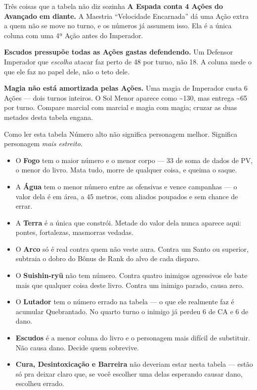\begin{aviso}{Três coisas que a tabela não diz sozinha}
    \textbf{A Espada conta 4 Ações do Avançado em diante.} A Maestria \enquote{Velocidade
    Encarnada} dá uma Ação extra a quem não se move no turno, e os números já assumem isso.
    Ela é a única coluna com uma 4ª Ação antes do Imperador.

    \medskip
    \textbf{Escudos pressupõe todas as Ações gastas defendendo.} Um Defensor Imperador que
    \emph{escolha} atacar faz perto de 48 por turno, não 18. A coluna mede o que ele faz no
    papel dele, não o teto dele.

    \medskip
    \textbf{Magia não está amortizada pelas Ações.} Uma magia de Imperador custa 6 Ações ---
    dois turnos inteiros. O Sol Menor aparece como \textasciitilde130, mas entrega
    \textasciitilde65 por turno. Compare marcial com marcial e magia com magia; cruzar as
    duas metades desta tabela engana.
\end{aviso}

\begin{nota}{Como ler esta tabela}
    Número alto não significa personagem melhor. Significa personagem \emph{mais estreito}.

    \begin{itemize}
        \item O \textbf{Fogo} tem o maior número e o menor corpo --- 33 de soma de dados de
              PV, o menor do livro. Mata tudo, morre de qualquer coisa, e queima o saque.
        \item A \textbf{Água} tem o menor número entre as ofensivas e vence campanhas --- o
              valor dela é em área, a 45 metros, com aliados poupados e sem chance de errar.
        \item A \textbf{Terra} é a única que constrói. Metade do valor dela nunca aparece
              aqui: pontes, fortalezas, masmorras vedadas.
        \item O \textbf{Arco} só é real contra quem não veste aura. Contra um Santo ou
              superior, subtraia o dobro do Bônus de Rank do alvo de cada disparo.
        \item O \textbf{Suishin-ryū} não tem número. Contra quatro inimigos agressivos ele bate
              mais que qualquer coisa deste livro. Contra um inimigo parado, causa zero.
        \item O \textbf{Lutador} tem o número errado na tabela --- o que ele realmente faz é
              acumular Quebrantado. No quarto turno o inimigo já perdeu 6 de CA e 6 de dano.
        \item \textbf{Escudos} é a menor coluna do livro e o personagem mais difícil de
              substituir. Não causa dano. Decide quem sobrevive.
        \item \textbf{Cura, Desintoxicação e Barreira} não deveriam estar nesta tabela ---
              estão só pra deixar claro que, se você escolher uma delas esperando causar dano,
              escolheu errado.
    \end{itemize}
\end{nota}

